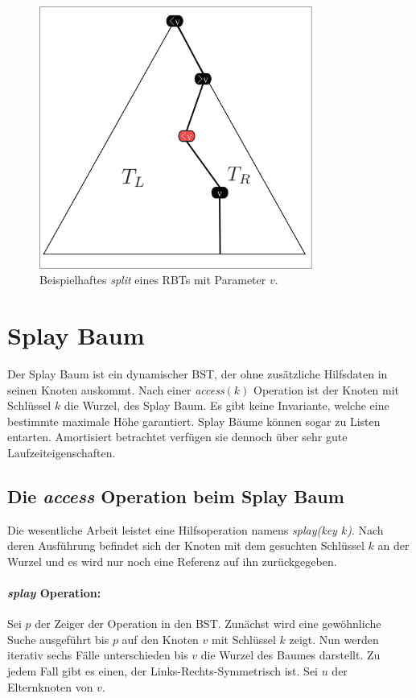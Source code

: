 \documentclass[a4paper,12pt]{article}
\begin{document}
\begin{figure}[H]
	\centering
	\includegraphics[width=0.8\textwidth]{"Medien/RotSchwarzBaum/aufteilen"}
	\caption{Beispielhaftes \textit{split} eines RBTs mit Parameter $v$. }
	\label{fig:aufteilen}
\end{figure}


\section{Splay Baum}
Der  Splay Baum \cite{splay} ist ein dynamischer BST, der ohne zusätzliche Hilfsdaten in seinen Knoten auskommt. Nach einer \textit{access}$\left(k\right)$ Operation ist der Knoten mit Schlüssel $k$ die Wurzel, des Splay Baum. Es gibt keine Invariante, welche eine bestimmte maximale Höhe garantiert. Splay Bäume können sogar zu Listen entarten. Amortisiert betrachtet verfügen sie dennoch über sehr gute Laufzeiteigenschaften. 


\subsection{Die \textit{access} Operation beim Splay Baum }
Die wesentliche Arbeit leistet eine Hilfsoperation namens \textit{splay(key $k$)}. Nach deren Ausführung befindet sich der Knoten mit dem gesuchten Schlüssel $k$ an der Wurzel und es wird nur noch eine Referenz auf ihn zurückgegeben.

\paragraph{\textit{splay} Operation:}
Sei $p$ der Zeiger der Operation in den BST. Zunächst wird eine gewöhnliche Suche ausgeführt bis $p$ auf den Knoten $v$ mit Schlüssel $k$ zeigt. Nun werden iterativ sechs Fälle unterschieden bis $v$ die Wurzel des Baumes darstellt. Zu jedem Fall gibt es einen, der Links-Rechts-Symmetrisch ist. Sei $u$ der Elternknoten von $v$. 
\end{document}
